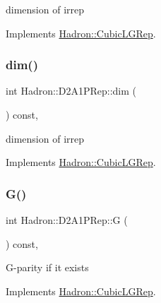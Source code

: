 dimension of irrep 

Implements \mbox{\hyperlink{structHadron_1_1CubicLGRep_a3acbaea26503ed64f20df693a48e4cdd}{Hadron\+::\+Cubic\+L\+G\+Rep}}.

\mbox{\label{structHadron_1_1D2A1PRep_a662b1c07136e38264b71c20d97f232ce}} 
\subsubsection{\texorpdfstring{dim()}{dim()}\hspace{0.1cm}{\footnotesize\ttfamily [3/3]}}
{\footnotesize\ttfamily int Hadron\+::\+D2\+A1\+P\+Rep\+::dim (\begin{DoxyParamCaption}{ }\end{DoxyParamCaption}) const\hspace{0.3cm}{\ttfamily [inline]}, {\ttfamily [virtual]}}

dimension of irrep 

Implements \mbox{\hyperlink{structHadron_1_1CubicLGRep_a3acbaea26503ed64f20df693a48e4cdd}{Hadron\+::\+Cubic\+L\+G\+Rep}}.

\mbox{\label{structHadron_1_1D2A1PRep_a624a76654139bb65156e67aeb663c84c}} 
\subsubsection{\texorpdfstring{G()}{G()}\hspace{0.1cm}{\footnotesize\ttfamily [1/3]}}
{\footnotesize\ttfamily int Hadron\+::\+D2\+A1\+P\+Rep\+::G (\begin{DoxyParamCaption}{ }\end{DoxyParamCaption}) const\hspace{0.3cm}{\ttfamily [inline]}, {\ttfamily [virtual]}}

G-\/parity if it exists 

Implements \mbox{\hyperlink{structHadron_1_1CubicLGRep_ace26f7b2d55e3a668a14cb9026da5231}{Hadron\+::\+Cubic\+L\+G\+Rep}}.

\mbox{\label{structHadron_1_1D2A1PRep_a624a76654139bb65156e67aeb663c84c}} 
